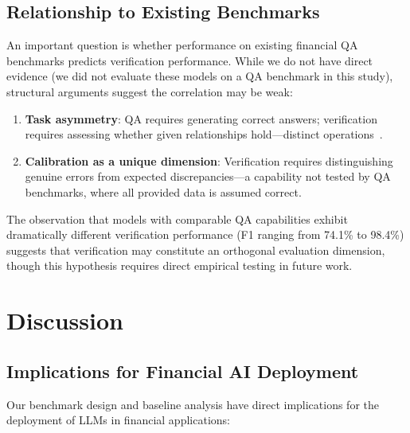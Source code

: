 \documentclass[11pt]{article}
\begin{document}
\subsection{Relationship to Existing Benchmarks}
\label{sec:analysis:comparison}

An important question is whether performance on existing financial QA benchmarks predicts verification performance.
While we do not have direct evidence (we did not evaluate these models on a QA benchmark in this study), structural arguments suggest the correlation may be weak:

\begin{enumerate}[topsep=2pt,itemsep=1pt]
    \item \textbf{Task asymmetry}: QA requires generating correct answers; verification requires assessing whether given relationships hold---distinct operations~\citep{mathcomp2025}.
    \item \textbf{Calibration as a unique dimension}: Verification requires distinguishing genuine errors from expected discrepancies---a capability not tested by QA benchmarks, where all provided data is assumed correct.
\end{enumerate}

The observation that models with comparable QA capabilities exhibit dramatically different verification performance (F1 ranging from 74.1\% to 98.4\%) suggests that verification may constitute an orthogonal evaluation dimension, though this hypothesis requires direct empirical testing in future work.

\section{Discussion}
\label{sec:discussion}

\subsection{Implications for Financial AI Deployment}

Our benchmark design and baseline analysis have direct implications for the deployment of LLMs in financial applications:
\end{document}
